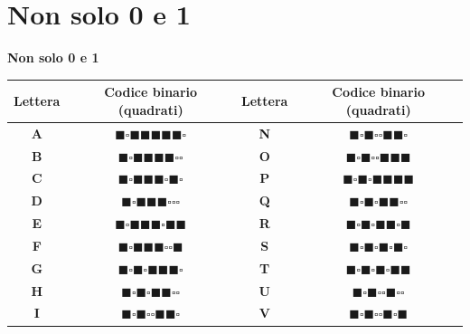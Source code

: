 \documentclass[hidelinks,aspectratio=169]{beamer}
\begin{document}
\section{\textbf{Non solo 0 e 1}}
\begin{frame}{\textbf{Non solo 0 e 1}}
	\renewcommand{\arraystretch}{1}
	\centering
	\begin{tabular}{|c|c|c|c|}
		\hline
		\textbf{Lettera} & \textbf{Codice binario (quadrati)} & \textbf{Lettera} & \textbf{Codice binario (quadrati)} \\
		\hline
		\textbf{A} & $\blacksquare\square\blacksquare\blacksquare\blacksquare\blacksquare\blacksquare\square$ & \textbf{N} & $\blacksquare\square\blacksquare\square\square\blacksquare\blacksquare\square$ \\
		\textbf{B} & $\blacksquare\square\blacksquare\blacksquare\blacksquare\blacksquare\square\square$ & \textbf{O} & $\blacksquare\square\blacksquare\square\square\blacksquare\blacksquare\blacksquare$ \\
		\textbf{C} & $\blacksquare\square\blacksquare\blacksquare\blacksquare\square\blacksquare\square$ & \textbf{P} & $\blacksquare\square\blacksquare\square\blacksquare\blacksquare\blacksquare\blacksquare$ \\
		\textbf{D} & $\blacksquare\square\blacksquare\blacksquare\blacksquare\square\square\square$ & \textbf{Q} & $\blacksquare\square\blacksquare\square\blacksquare\blacksquare\square\square$ \\
		\textbf{E} & $\blacksquare\square\blacksquare\blacksquare\blacksquare\square\blacksquare\blacksquare$ & \textbf{R} & $\blacksquare\square\blacksquare\square\blacksquare\blacksquare\square\blacksquare$ \\
		\textbf{F} & $\blacksquare\square\blacksquare\blacksquare\blacksquare\square\square\blacksquare$ & \textbf{S} & $\blacksquare\square\blacksquare\square\blacksquare\square\blacksquare\square$ \\
		\textbf{G} & $\blacksquare\square\blacksquare\square\blacksquare\blacksquare\blacksquare\square$ & \textbf{T} & $\blacksquare\square\blacksquare\square\blacksquare\square\blacksquare\blacksquare$ \\
		\textbf{H} & $\blacksquare\square\blacksquare\square\blacksquare\blacksquare\square\square$ & \textbf{U} & $\blacksquare\square\blacksquare\square\square\blacksquare\square\square$ \\
		\textbf{I} & $\blacksquare\square\blacksquare\square\square\blacksquare\blacksquare\square$ & \textbf{V} & $\blacksquare\square\blacksquare\square\square\blacksquare\square\blacksquare$ \\

\end{tabular}
\end{frame}
\end{document}

